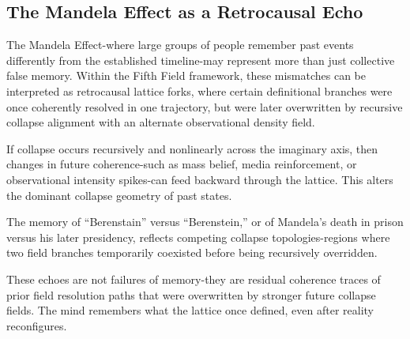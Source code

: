 \subsection*{The Mandela Effect as a Retrocausal Echo}

The Mandela Effect-where large groups of people remember past events differently from the established timeline-may represent more than just collective false memory. Within the Fifth Field framework, these mismatches can be interpreted as retrocausal lattice forks, where certain definitional branches were once coherently resolved in one trajectory, but were later overwritten by recursive collapse alignment with an alternate observational density field.

If collapse occurs recursively and nonlinearly across the imaginary axis, then changes in future coherence-such as mass belief, media reinforcement, or observational intensity spikes-can feed backward through the lattice. This alters the dominant collapse geometry of past states.

The memory of “Berenstain” versus “Berenstein,” or of Mandela's death in prison versus his later presidency, reflects competing collapse topologies-regions where two field branches temporarily coexisted before being recursively overridden.

These echoes are not failures of memory-they are residual coherence traces of prior field resolution paths that were overwritten by stronger future collapse fields. The mind remembers what the lattice once defined, even after reality reconfigures.

